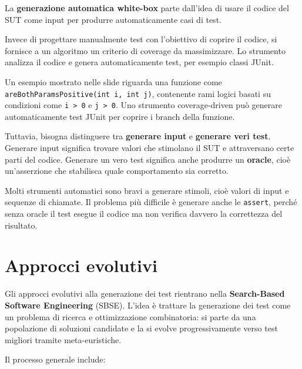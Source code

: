 La \textbf{generazione automatica white-box} parte dall'idea di usare il codice del SUT come input per produrre automaticamente casi di test.

Invece di progettare manualmente test con l'obiettivo di coprire il codice, si fornisce a un algoritmo un criterio di coverage da massimizzare. Lo strumento analizza il codice e genera automaticamente test, per esempio classi JUnit.

\begin{notaslide}

Un esempio mostrato nelle slide riguarda una funzione come \texttt{areBothParamsPositive(int i, int j)}, contenente rami logici basati su condizioni come \texttt{i > 0} e \texttt{j > 0}. Uno strumento coverage-driven può generare automaticamente test JUnit per coprire i branch della funzione.

\end{notaslide}

Tuttavia, bisogna distinguere tra \textbf{generare input} e \textbf{generare veri test}. Generare input significa trovare valori che stimolano il SUT e attraversano certe parti del codice. Generare un vero test significa anche produrre un \textbf{oracle}, cioè un'asserzione che stabilisca quale comportamento sia corretto.

\begin{notaprof}

Molti strumenti automatici sono bravi a generare stimoli, cioè valori di input e sequenze di chiamate. Il problema più difficile è generare anche le \texttt{assert}, perché senza oracle il test esegue il codice ma non verifica davvero la correttezza del risultato.

\end{notaprof}

\section{Approcci evolutivi}

Gli approcci evolutivi alla generazione dei test rientrano nella \textbf{Search-Based Software Engineering} (SBSE). L'idea è trattare la generazione dei test come un problema di ricerca e ottimizzazione combinatoria: si parte da una popolazione di soluzioni candidate e la si evolve progressivamente verso test migliori tramite meta-euristiche.

Il processo generale include:


